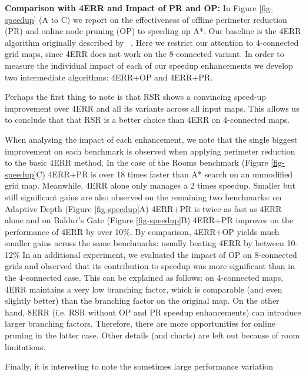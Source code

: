 \textbf{Comparison with 4ERR and Impact of PR and OP:}
In Figure \ref{fig-speedup} (A to C) we report on the 
effectiveness of offline perimeter reduction (PR) and online 
node pruning (OP) to speeding up A*.
Our baseline is the 4ERR algorithm originally described by \citeauthor{harabor10}~.
Here we restrict our attention to 4-connected grid maps,
since 4ERR does not work on the 8-connected variant.
In order to measure the individual impact of each of our speedup enhancements
we develop two intermediate algorithms: 4ERR+OP and 4ERR+PR.
\par
Perhaps the first thing to note is that RSR shows a convincing 
speed-up improvement over 4ERR and all its variants across all input maps.
This allows us to conclude that that RSR is a better choice than 4ERR on
4-connected maps.
\par
When analysing the impact of each enhancement,
we note that the single biggest improvement on each
benchmark is observed when applying perimeter reduction to the basic 4ERR method.
In the case of the Rooms benchmark (Figure \ref{fig-speedup}C) 4ERR+PR is over
18 times faster than A* search on an unmodified grid map.
Meanwhile, 4ERR alone only manages a 2 times speedup.
Smaller but still significant gains are also observed on the remaining two benchmarks:
on Adaptive Depth (Figure \ref{fig-speedup}A) 4ERR+PR is twice as fast as 4ERR alone
and on Baldur's Gate (Figure \ref{fig-speedup}B) 4ERR+PR improves on
the performance of 4ERR by over 10\%.
By comparison, 4ERR+OP yields much smaller gains across the same
benchmarks: usually beating 4ERR by between 10-12\%
In an additional experiment, we evaluated the impact of OP on 8-connected
grids and observed that its contribution to speedup was more significant than in 
the 4-connected case.
This can be explained as follows: on 4-connected maps, 4ERR maintains a very low
branching factor, which is comparable (and even slightly better) than the branching
factor on the original map. 
On the other hand, 8ERR (i.e. RSR without OP and PR speedup enhancements) 
can introduce larger branching factors. Therefore, there are more opportunities for 
online pruning in the latter case. 
Other details (and charts) are left out because of room limitations.
\par
Finally, it is interesting to note the sometimes large performance variation 
